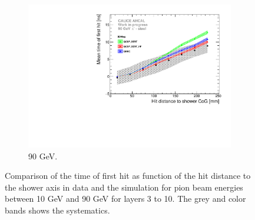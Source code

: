 \begin{figure}[htbp!]
\begin{subfigure}[t]{0.49\textwidth}
    \includegraphics[width=1\textwidth]{../Thesis_Plots/Timing/Pions/Plots/ComparisonToSim/Time_Radius_90GeV_SSF_DD4hep.pdf}
    \caption{90 GeV.} \label{fig:Radius_SSF_SimData_90GeV_DD4hep}
  \end{subfigure}
  \caption{Comparison of the time of first hit as function of the hit distance to the shower axis in data and the \ddhep simulation for pion beam energies between 10 GeV and 90 GeV for layers 3 to 10. The grey and color bands shows the systematics.}
\end{figure}

